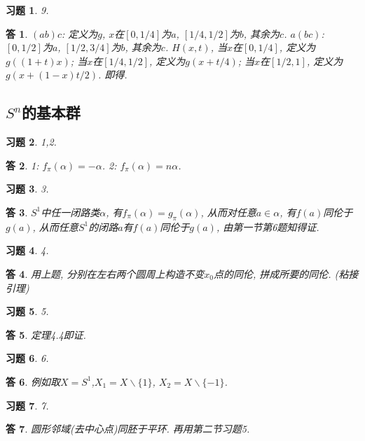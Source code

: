 \documentclass{ctexart}%
\newtheorem*{exercise}{习题}
\newtheorem*{solution}{答}
\theoremstyle{definition}
\theoremstyle{remark}
\begin{document}
\begin{exercise}9.
\end{exercise}
\begin{solution}
$(ab)c$: 定义为$g$, $x$在$[0,1/4]$为$a$, $[1/4,1/2]$为$b$, 其余为$c$. $a(bc)$: $[0,1/2]$为$a$, $[1/2,3/4]$为$b$, 其余为$c$. $H(x,t)$, 当$x$在$[0,1/4]$, 定义为$g((1+t)x)$; 当$x$在$[1/4,1/2]$, 定义为$g(x+t/4)$; 当$x$在$[1/2,1]$, 定义为$g(x+(1-x)t/2)$. 即得.
\end{solution}

\subsection{$S^n$的基本群}

\begin{exercise}1,2.
\end{exercise}
\begin{solution}
1: $f_\pi(\alpha)=-\alpha$. 2: $f_\pi(\alpha)=n\alpha$.
\end{solution}
\begin{exercise}3.
\end{exercise}
\begin{solution}
$S^1$中任一闭路类$\alpha$, 有$f_\pi(\alpha)=g_\pi(\alpha)$, 从而对任意$a\in \alpha$, 有$f(a)$同伦于$g(a)$, 从而任意$S^1$的闭路$a$有$f(a)$同伦于$g(a)$, 由第一节第6题知得证.
\end{solution}

\begin{exercise}4.
\end{exercise}
\begin{solution}
用上题, 分别在左右两个圆周上构造不变$x_0$点的同伦, 拼成所要的同伦. (粘接引理)
\end{solution}

\begin{exercise}5.
\end{exercise}
\begin{solution}
定理4.4即证.
\end{solution}

\begin{exercise}6.
\end{exercise}
\begin{solution}
例如取$X=S^1$,$X_1=X\backslash\{1\}$, $X_2=X\backslash\{-1\}$.
\end{solution}

\begin{exercise}7.
\end{exercise}
\begin{solution}
圆形邻域(去中心点)同胚于平环. 再用第二节习题5. 
\end{solution}
\end{document}
